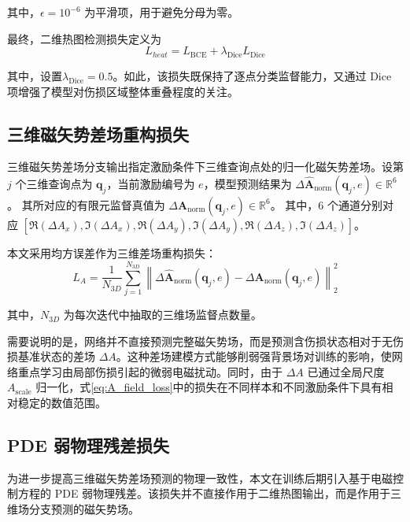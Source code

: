 其中，$\epsilon=10^{-6}$ 为平滑项，用于避免分母为零。

最终，二维热图检测损失定义为
\begin{equation}
\label{eq:heat_loss}
L_{heat}
=
L_{\mathrm{BCE}}
+
\lambda_{\mathrm{Dice}}L_{\mathrm{Dice}}
\end{equation}

其中，设置$\lambda_{\mathrm{Dice}}=0.5$。如此，该损失既保持了逐点分类监督能力，又通过 Dice 项增强了模型对伤损区域整体重叠程度的关注。

\subsection{三维磁矢势差场重构损失}
\label{subsec:A_field_loss}

三维磁矢势差场分支输出指定激励条件下三维查询点处的归一化磁矢势差场。设第 $j$ 个三维查询点为 $\mathbf q_j$，当前激励编号为 $e$，模型预测结果为
$
\Delta \hat{\mathbf A}_{\mathrm{norm}}(\mathbf q_j,e)
\in\mathbb{R}^{6}
$。
其所对应的有限元监督真值为
$
\Delta \mathbf A_{\mathrm{norm}}(\mathbf q_j,e)
\in\mathbb{R}^{6}
$。
其中，6 个通道分别对应
$
[
\Re(\Delta A_x),
\Im(\Delta A_x),
\Re(\Delta A_y),
\Im(\Delta A_y),
\Re(\Delta A_z),
\Im(\Delta A_z)
]
$。

本文采用均方误差作为三维差场重构损失：
\begin{equation}
\label{eq:A_field_loss}
L_A
=
\frac{1}{N_{3D}}
\sum_{j=1}^{N_{3D}}
\left\|
\Delta \hat{\mathbf A}_{\mathrm{norm}}(\mathbf q_j,e)
-
\Delta \mathbf A_{\mathrm{norm}}(\mathbf q_j,e)
\right\|_2^2
\end{equation}

其中，$N_{3D}$ 为每次迭代中抽取的三维场监督点数量。

需要说明的是，网络并不直接预测完整磁矢势场，而是预测含伤损状态相对于无伤损基准状态的差场 $\Delta A$。这种差场建模方式能够削弱强背景场对训练的影响，使网络重点学习由局部伤损引起的微弱电磁扰动。同时，由于 $\Delta A$ 已通过全局尺度 $A_{\mathrm{scale}}$ 归一化，式\eqref{eq:A_field_loss}中的损失在不同样本和不同激励条件下具有相对稳定的数值范围。

\subsection{PDE 弱物理残差损失}
\label{subsec:pde_loss}

为进一步提高三维磁矢势差场预测的物理一致性，本文在训练后期引入基于电磁控制方程的 PDE 弱物理残差。该损失并不直接作用于二维热图输出，而是作用于三维场分支预测的磁矢势场。

